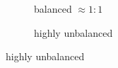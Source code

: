 \begin{frame}
\begin{figure}[ht]
     \centering
     \begin{subfigure}[t]{0.28\textwidth}
         \centering
         \usebox{\imagebox}%
         \caption{balanced $\approx 1:1$}
     \end{subfigure}
     \hspace{5mm}
     \begin{subfigure}[t]{0.28\textwidth}
         \centering
         \caption{highly unbalanced}
         \label{fig:linear}
     \end{subfigure}
\end{figure} 


\end{frame}
